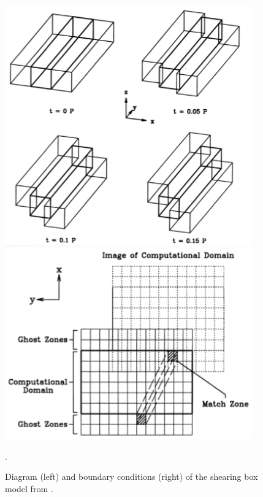 \documentclass{jfm}
\begin{document}
\begin{figure}
    \begin{minipage}[t]{0.5\textwidth}
        \begin{center}
            \includegraphics[width=0.95\textwidth]{shearbox1}
        \end{center}
    \end{minipage}
    \hfill
    \begin{minipage}[t]{0.5\textwidth}
        \begin{center}
            \includegraphics[width=0.95\textwidth]{shearbox2}
        \end{center}
    \end{minipage}
    \caption{Diagram (left) and boundary conditions (right) of the shearing box model from \cite{Balbus1991}.}.
    \label{fig:shearbox}
\end{figure}
\end{document}
